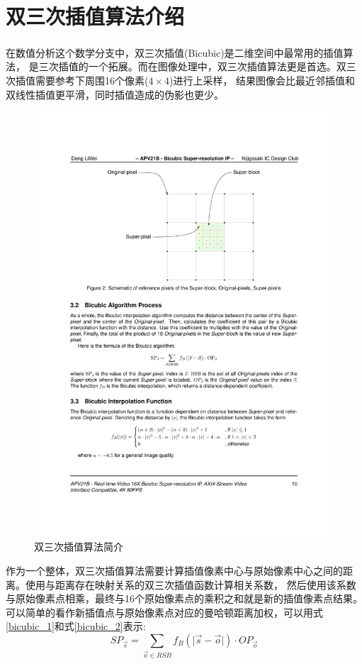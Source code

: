 \documentclass[12pt, a4paper, oneside]{ctexbook}
\begin{document}
	\section{双三次插值算法介绍}
	在数值分析这个数学分支中，双三次插值(Bicubic)\textsuperscript{\cite{10}\cite{11}}是二维空间中最常用的插值算法，
	是三次插值的一个拓展。而在图像处理中，双三次插值算法更是首选。双三次插值需要参考下周围16个像素($4 \times 4$)进行上采样，
	结果图像会比最近邻插值和双线性插值更平滑，同时插值造成的伪影也更少。
		\begin{figure}[h]
			\centering
			\includegraphics[scale=1]{./pic/bicubic-introduction.pdf}
			\caption{双三次插值算法简介}
			\label{bicubic_introduction}
		\end{figure}
	\par
	作为一个整体，双三次插值算法需要计算插值像素中心与原始像素中心之间的距离。使用与距离存在映射关系的双三次插值函数计算相关系数，
	然后使用该系数与原始像素点相乘，最终与16个原始像素点的乘积之和就是新的插值像素点结果。
	可以简单的看作新插值点与原始像素点对应的曼哈顿距离加权，可以用式\ref{bicubic_1}和式\ref{bicubic_2}表示:
	\begin{equation}
	SP_{\vec{s}}=\sum_{\vec{o}\in{RSB}}f_B(\vert\vec{s}-\vec{o}\vert)\cdot OP_{\vec{o}}		
	\label{bicubic_1}
	\end{equation}	
\end{document}
